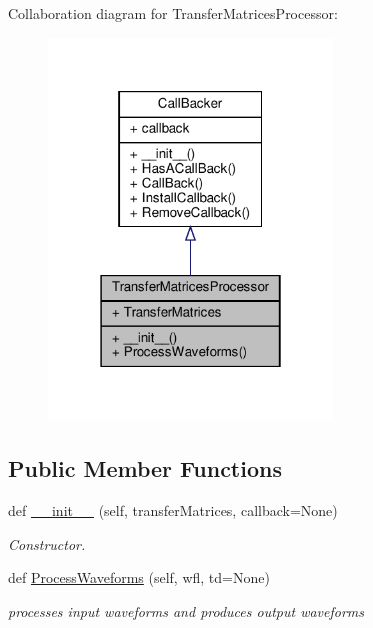 Collaboration diagram for Transfer\+Matrices\+Processor\+:
\nopagebreak
\begin{figure}[H]
\begin{center}
\leavevmode
\includegraphics[width=214pt]{classSignalIntegrity_1_1TimeDomain_1_1Filters_1_1TransferMatricesProcessor_1_1TransferMatricesProcessor__coll__graph}
\end{center}
\end{figure}
\subsection*{Public Member Functions}
\begin{DoxyCompactItemize}
\item 
def \hyperlink{classSignalIntegrity_1_1TimeDomain_1_1Filters_1_1TransferMatricesProcessor_1_1TransferMatricesProcessor_a5ebf8388e92aaa7273f885b0ee6d418e}{\+\_\+\+\_\+init\+\_\+\+\_\+} (self, transfer\+Matrices, callback=None)
\begin{DoxyCompactList}\small\item\em Constructor. \end{DoxyCompactList}\item 
def \hyperlink{classSignalIntegrity_1_1TimeDomain_1_1Filters_1_1TransferMatricesProcessor_1_1TransferMatricesProcessor_a407999013bef4f9b70aae3375dc839c9}{Process\+Waveforms} (self, wfl, td=None)
\begin{DoxyCompactList}\small\item\em processes input waveforms and produces output waveforms \end{DoxyCompactList}\end{DoxyCompactItemize}


